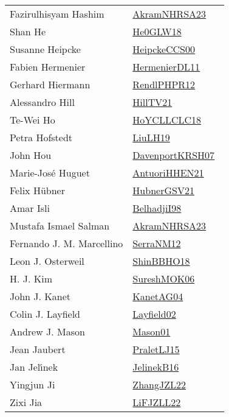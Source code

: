 {\begin{longtable}{p{4cm}p{20cm}}
Fazirulhisyam Hashim & \href{works/AkramNHRSA23.pdf}{AkramNHRSA23}~\cite{AkramNHRSA23}\\
Shan He & \href{works/He0GLW18.pdf}{He0GLW18}~\cite{He0GLW18}\\
Susanne Heipcke & \href{works/HeipckeCCS00.pdf}{HeipckeCCS00}~\cite{HeipckeCCS00}\\
Fabien Hermenier & \href{works/HermenierDL11.pdf}{HermenierDL11}~\cite{HermenierDL11}\\
Gerhard Hiermann & \href{works/RendlPHPR12.pdf}{RendlPHPR12}~\cite{RendlPHPR12}\\
Alessandro Hill & \href{works/HillTV21.pdf}{HillTV21}~\cite{HillTV21}\\
Te{-}Wei Ho & \href{works/HoYCLLCLC18.pdf}{HoYCLLCLC18}~\cite{HoYCLLCLC18}\\
Petra Hofstedt & \href{works/LiuLH19.pdf}{LiuLH19}~\cite{LiuLH19}\\
John Hou & \href{works/DavenportKRSH07.pdf}{DavenportKRSH07}~\cite{DavenportKRSH07}\\
Marie{-}Jos{\'{e}} Huguet & \href{works/AntuoriHHEN21.pdf}{AntuoriHHEN21}~\cite{AntuoriHHEN21}\\
Felix H{\"{u}}bner & \href{works/HubnerGSV21.pdf}{HubnerGSV21}~\cite{HubnerGSV21}\\
Amar Isli & \href{works/BelhadjiI98.pdf}{BelhadjiI98}~\cite{BelhadjiI98}\\
Mustafa Ismael Salman & \href{works/AkramNHRSA23.pdf}{AkramNHRSA23}~\cite{AkramNHRSA23}\\
Fernando J. M. Marcellino & \href{works/SerraNM12.pdf}{SerraNM12}~\cite{SerraNM12}\\
Leon J. Osterweil & \href{works/ShinBBHO18.pdf}{ShinBBHO18}~\cite{ShinBBHO18}\\
H. J. Kim & \href{}{SureshMOK06}~\cite{SureshMOK06}\\
John J. Kanet & \href{}{KanetAG04}~\cite{KanetAG04}\\
Colin J. Layfield & \href{}{Layfield02}~\cite{Layfield02}\\
Andrew J. Mason & \href{works/Mason01.pdf}{Mason01}~\cite{Mason01}\\
Jean Jaubert & \href{works/PraletLJ15.pdf}{PraletLJ15}~\cite{PraletLJ15}\\
Jan Jel{\'{\i}}nek & \href{works/JelinekB16.pdf}{JelinekB16}~\cite{JelinekB16}\\
Yingjun Ji & \href{works/ZhangJZL22.pdf}{ZhangJZL22}~\cite{ZhangJZL22}\\
Zixi Jia & \href{works/LiFJZLL22.pdf}{LiFJZLL22}~\cite{LiFJZLL22}\\

\end{longtable}}
